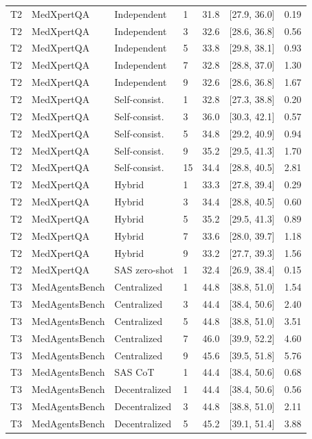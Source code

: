 \begin{table}[t]
\begin{tabular}{@{}llllrrr@{}}
T2 & MedXpertQA & Independent & 1 & 31.8 & [27.9, 36.0] & 0.19 \\
T2 & MedXpertQA & Independent & 3 & 32.6 & [28.6, 36.8] & 0.56 \\
T2 & MedXpertQA & Independent & 5 & 33.8 & [29.8, 38.1] & 0.93 \\
T2 & MedXpertQA & Independent & 7 & 32.8 & [28.8, 37.0] & 1.30 \\
T2 & MedXpertQA & Independent & 9 & 32.6 & [28.6, 36.8] & 1.67 \\
T2 & MedXpertQA & Self-consist. & 1 & 32.8 & [27.3, 38.8] & 0.20 \\
T2 & MedXpertQA & Self-consist. & 3 & 36.0 & [30.3, 42.1] & 0.57 \\
T2 & MedXpertQA & Self-consist. & 5 & 34.8 & [29.2, 40.9] & 0.94 \\
T2 & MedXpertQA & Self-consist. & 9 & 35.2 & [29.5, 41.3] & 1.70 \\
T2 & MedXpertQA & Self-consist. & 15 & 34.4 & [28.8, 40.5] & 2.81 \\
T2 & MedXpertQA & Hybrid & 1 & 33.3 & [27.8, 39.4] & 0.29 \\
T2 & MedXpertQA & Hybrid & 3 & 34.4 & [28.8, 40.5] & 0.60 \\
T2 & MedXpertQA & Hybrid & 5 & 35.2 & [29.5, 41.3] & 0.89 \\
T2 & MedXpertQA & Hybrid & 7 & 33.6 & [28.0, 39.7] & 1.18 \\
T2 & MedXpertQA & Hybrid & 9 & 33.2 & [27.7, 39.3] & 1.56 \\
T2 & MedXpertQA & SAS zero-shot & 1 & 32.4 & [26.9, 38.4] & 0.15 \\
T3 & MedAgentsBench & Centralized & 1 & 44.8 & [38.8, 51.0] & 1.54 \\
T3 & MedAgentsBench & Centralized & 3 & 44.4 & [38.4, 50.6] & 2.40 \\
T3 & MedAgentsBench & Centralized & 5 & 44.8 & [38.8, 51.0] & 3.51 \\
T3 & MedAgentsBench & Centralized & 7 & 46.0 & [39.9, 52.2] & 4.60 \\
T3 & MedAgentsBench & Centralized & 9 & 45.6 & [39.5, 51.8] & 5.76 \\
T3 & MedAgentsBench & SAS CoT & 1 & 44.4 & [38.4, 50.6] & 0.68 \\
T3 & MedAgentsBench & Decentralized & 1 & 44.4 & [38.4, 50.6] & 0.56 \\
T3 & MedAgentsBench & Decentralized & 3 & 44.8 & [38.8, 51.0] & 2.11 \\
T3 & MedAgentsBench & Decentralized & 5 & 45.2 & [39.1, 51.4] & 3.88 \\

\end{tabular}
\end{table}
